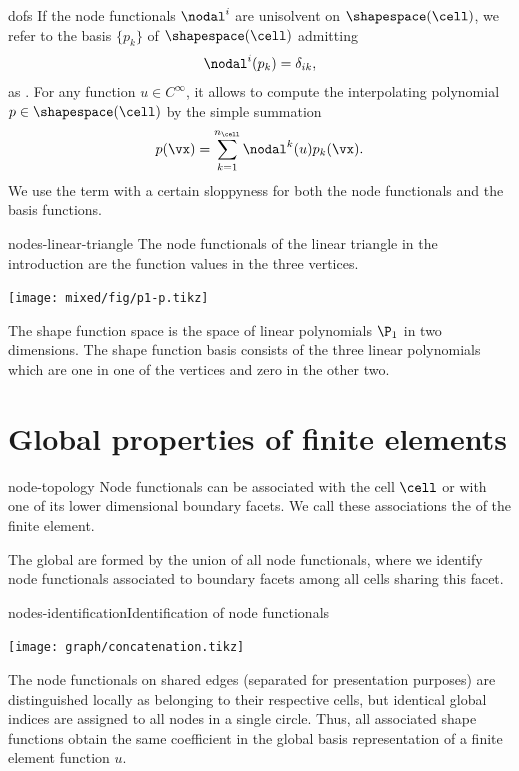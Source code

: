 \begin{Notation}{dofs}
  If the node functionals $\nodal^i$ are unisolvent on
  $\shapespace(\cell)$, we refer to the basis $\{p_k\}$ of
  $\shapespace(\cell)$ admitting
  \begin{gather}
    \nodal^i(p_k) = \delta_{ik},
  \end{gather}
  as . For any function $u\in C^\infty$,
  it allows to compute the interpolating polynomial
  $p \in \shapespace(\cell)$ by the simple summation
  \begin{gather}
    p(\vx) = \sum_{k=1}^{n_\cell} \nodal^k(u) p_k(\vx).
  \end{gather}
  We use the term  with a certain
  sloppyness for both the node functionals and the basis functions.
\end{Notation}

\begin{Example}{nodes-linear-triangle}
  The node functionals of the linear triangle in the introduction are the function values in the three vertices.
  \begin{center}
    \texttt{[image: mixed/fig/p1-p.tikz]}    
  \end{center}
  The shape function space is the space of linear polynomials $\P_1$
  in two dimensions. The shape function basis consists of the three
  linear polynomials which are one in one of the vertices and zero in
  the other two.
\end{Example}

\section{Global properties of finite elements}

\begin{Definition}{node-topology}
  Node functionals can be associated with the cell $\cell$ or with one
  of its lower dimensional boundary facets. We call these associations
  the  of the finite element.

  The global  are formed by the union of all
  node functionals, where we identify node functionals associated to
  boundary facets among all cells sharing this facet.  
\end{Definition}

\begin{Example*}{nodes-identification}{Identification of node functionals}
  \begin{center}
    \texttt{[image: graph/concatenation.tikz]}    
  \end{center}
  The node functionals on
    shared edges (separated for presentation purposes) are
    distinguished locally as belonging to their respective cells, but
    identical global indices are assigned to all nodes in a single
    circle. Thus, all associated shape functions obtain the same
    coefficient in the global basis representation of a finite element
    function $u$.
\end{Example*}

